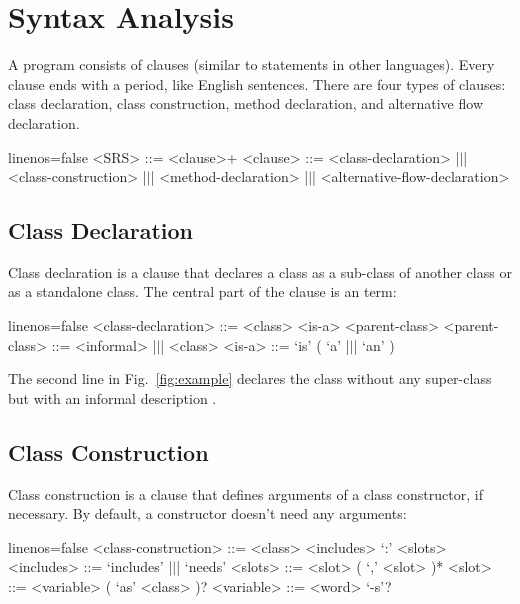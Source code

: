 \documentclass[sigplan,10pt,screen]{acmart}
\begin{document}
\section{Syntax Analysis}
\label{sec:syntax}

A program consists of clauses (similar to statements in other
languages). Every clause ends with a period, like English sentences. There
are four types of clauses: class declaration, class construction, method
declaration, and alternative flow declaration.

\begin{ffcode*}{linenos=false}
<SRS> ::= <clause>+
<clause> ::= <class-declaration>
  |$\vert$| <class-construction>
  |$\vert$| <method-declaration>
  |$\vert$| <alternative-flow-declaration>
\end{ffcode*}

\subsection{Class Declaration}

Class declaration is a clause that declares a class as a sub-class of
another class or as a standalone class. The central part of the clause is
an  term:

\begin{ffcode*}{linenos=false}
<class-declaration> ::= <class>
  <is-a> <parent-class>
<parent-class> ::= <informal> |$\vert$| <class>
<is-a> ::= `is' ( `a' |$\vert$| `an' )
\end{ffcode*}

The second line in Fig.~\ref{fig:example} declares the class 
without any super-class but with an informal description
.

\subsection{Class Construction}

Class construction is a clause that defines arguments of a class
constructor, if necessary. By default, a constructor doesn't need any
arguments:

\begin{ffcode*}{linenos=false}
<class-construction> ::= <class> <includes>
  `:' <slots>
<includes> ::= `includes' |$\vert$| `needs'
<slots> ::= <slot> ( `,' <slot> )*
<slot> ::= <variable> ( `as' <class> )?
<variable> ::= <word> `-s'?
\end{ffcode*}
\end{document}
